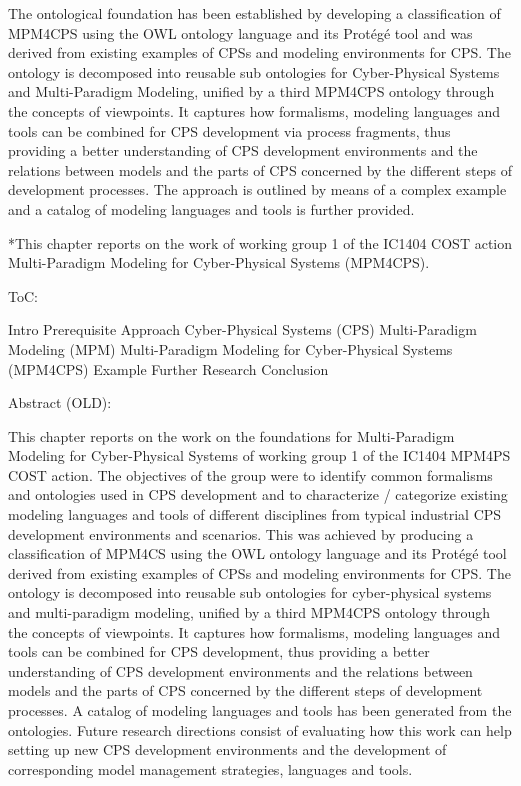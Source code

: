 \documentclass[a4paper,8pt]{article}
\begin{document}
The ontological foundation has been established by developing a classification of MPM4CPS using the OWL ontology language and its Protégé tool and was derived from existing examples of CPSs and modeling environments for CPS. The ontology is decomposed into reusable sub ontologies for Cyber-Physical Systems and Multi-Paradigm Modeling, unified by a third MPM4CPS ontology through the concepts of viewpoints. It captures how formalisms, modeling languages and tools can be combined for CPS development via process fragments, thus providing a better understanding of CPS development environments and the relations between models and the parts of CPS concerned by the different steps of development processes. The approach is outlined by means of a complex example and a catalog of modeling languages and tools is further provided. 

*This chapter reports on the work of working group 1 of the IC1404 COST action Multi-Paradigm Modeling for Cyber-Physical Systems (MPM4CPS).

ToC:

Intro
Prerequisite
Approach
Cyber-Physical Systems (CPS)
Multi-Paradigm Modeling (MPM) 
Multi-Paradigm Modeling for Cyber-Physical Systems (MPM4CPS)
Example
Further Research
Conclusion


Abstract (OLD):

This chapter reports on the work on the foundations for Multi-Paradigm Modeling for Cyber-Physical Systems of working group 1 of the IC1404 MPM4PS COST action. The objectives of the group were to identify common formalisms and ontologies used in CPS development and to characterize / categorize existing modeling languages and tools of different disciplines from typical industrial CPS development environments and scenarios. This was achieved by producing a classification of MPM4CS using the OWL ontology language and its Protégé tool derived from existing examples of CPSs and modeling environments for CPS. The ontology is decomposed into reusable sub ontologies for cyber-physical systems and multi-paradigm modeling, unified by a third MPM4CPS ontology through the concepts of viewpoints. It captures how formalisms, modeling languages and tools can be combined for CPS development, thus providing a better understanding of CPS development environments and the relations between models and the parts of CPS concerned by the different steps of development processes. A catalog of modeling languages and tools has been generated from the ontologies. Future research directions consist of evaluating how this work can help setting up new CPS development environments and the development of corresponding model management strategies, languages and tools.
\end{document}
